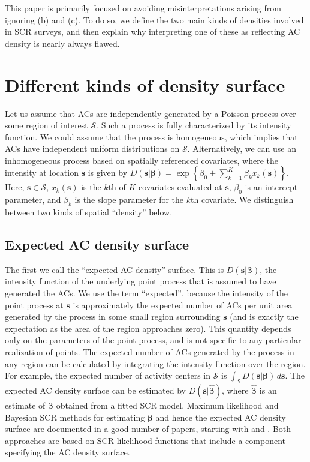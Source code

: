 \documentclass[useAMS,usenatbib,referee]{biom}
\begin{document}
This paper is primarily focused on avoiding misinterpretations arising from ignoring (b) and (c). To do so, we define the two main kinds of densities involved in SCR surveys, and then explain why interpreting one of these as reflecting AC density is nearly always flawed.

\section{Different kinds of density surface}\label{different-densities}

Let us assume that ACs are independently generated by a Poisson process over some region of interest $\mathcal{S}$. Such a process is fully characterized by its intensity function. We could assume that the process is homogeneous, which implies that ACs have independent uniform distributions on $\mathcal{S}$. Alternatively, we can use an inhomogeneous process based on spatially referenced covariates, where the intensity at location $\bm{s}$ is given by $D(\bm{s}|\bm{\beta})=\exp\left\{\beta_0 + \sum_{k=1}^K\beta_kx_k(\bm{s})\right\}$. Here, $\bm{s} \in \mathcal{S}$, $x_k(\bm{s})$ is the $k$th of $K$ covariates evaluated at $\bm{s}$, $\beta_0$ is an intercept parameter, and $\beta_k$ is the slope parameter for the $k$th covariate. We distinguish between two kinds of spatial ``density'' below. 

\subsection{Expected AC density surface} \label{s:eacd}

The first we call the ``expected AC density'' surface. This is $D(\bm{s}|\bm{\beta})$, the intensity function of the underlying point process that is assumed to have generated the ACs. We use the term ``expected'', because the intensity of the point process at $\bm{s}$ is approximately the expected number of ACs per unit area generated by the process in some small region surrounding $\bm{s}$ (and is exactly the expectation as the area of the region approaches zero). This quantity depends only on the parameters of the point process, and is not specific to any particular realization of points. The expected number of ACs generated by the process in any region can be calculated by integrating the intensity function over the region. For example, the expected number of activity centers in $\mathcal{S}$ is $\int_{\mathcal{S}} D(\bm{s}|\bm{\beta}) \, d\bm{s}$. The expected AC density surface can be estimated by $D(\bm{s}|\hat{\bm{\beta}})$, where $\hat{\bm{\beta}}$ is an estimate of $\bm{\beta}$ obtained from a fitted SCR model. Maximum likelihood and Bayesian SCR methods for estimating $\bm{\beta}$ and hence the expected AC density surface are documented in a good number of papers, starting with \cite{Borchers+Efford:08} and \cite{Royle+Young:08}. Both approaches are based on SCR likelihood functions that include a component specifying the AC density surface. 
\end{document}
